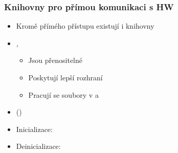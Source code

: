 
\begin{frame}
  \frametitle{Knihovny pro přímou komunikaci s HW}

  \begin{itemize}
    \item Kromě přímého  přístupu existují i knihovny
    \item {}, 
    \begin{itemize}
      \item Jsou přenositelné
      \item Poskytují lepší rozhraní
      \item Pracují se soubory v  a 
    \end{itemize}
  \end{itemize}

\end{frame}

\begin{frame}{}

  \begin{itemize}
    \item {} ()

    \pause

    \item Inicializace: 
    \item Deinicializace: 

  \end{itemize}

\end{frame}

